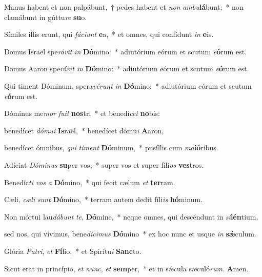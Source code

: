 \item Manus habent et non palpábunt,~† pedes habent et \textit{non} \textit{ambu}\textbf{lá}bunt;~* non clamábunt in gúttu\textit{re} \textbf{su}o.

\item Símiles illis erunt, qui \textit{fáciunt} \textbf{e}a,~* et omnes, qui confídunt \textit{in} \textbf{e}is.

\item Domus Israël spe\textit{rávit} \textit{in} \textbf{Dó}mino:~* adiutórium eórum et scutum \textit{e}\textbf{ó}rum est.

\item Domus Aaron spe\textit{rávit} \textit{in} \textbf{Dó}mino:~* adiutórium eórum et scutum \textit{e}\textbf{ó}rum est.

\item Qui timent Dóminum, spera\textit{vérunt} \textit{in} \textbf{Dó}mino:~* adiutórium eórum et scutum \textit{e}\textbf{ó}rum est.

\item Dóminus me\textit{mor} \textit{fuit} \textbf{nos}tri~* et benedí\textit{cet} \textbf{no}bis:

\item benedícet \textit{dómui} \textbf{Is}raël,~* benedícet dómu\textit{i} \textbf{A}aron,

\item benedícet ómnibus, \textit{qui} \textit{timent} \textbf{Dó}minum,~* pusíllis cum \textit{ma}\textbf{ió}ribus.

\item Adíciat \textit{Dóminus} \textbf{su}per vos,~* super vos et super fíli\textit{os} \textbf{ves}tros.

\item Benedíc\textit{ti} \textit{vos} \textit{a} \textbf{Dó}mino,~* qui fecit cælum \textit{et} \textbf{ter}ram.

\item Cæli, \textit{cæli} \textit{sunt} \textbf{Dó}mino,~* terram autem dedit fíli\textit{is} \textbf{hó}minum.

\item Non mórtui lau\textit{dábunt} \textit{te}, \textbf{Dó}mine,~* neque omnes, qui descéndunt in \textit{si}\textbf{lén}tium,

\item sed nos, qui vívimus, bene\textit{dícimus} \textbf{Dó}mino~* ex hoc nunc et usque \textit{in} \textbf{sǽ}culum.

\item Glória \textit{Patri}, \textit{et} \textbf{Fí}lio,~* et Spirítu\textit{i} \textbf{Sanc}to.

\item Sicut erat in princípio, \textit{et} \textit{nunc}, \textit{et} \textbf{sem}per,~* et in sǽcula sæculó\textit{rum}. \textbf{A}men.